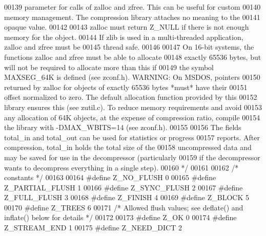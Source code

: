 \begin{DoxyCode}
00139 \textcolor{comment}{   parameter for calls of zalloc and zfree.  This can be useful for custom}
00140 \textcolor{comment}{   memory management.  The compression library attaches no meaning to the}
00141 \textcolor{comment}{   opaque value.}
00142 \textcolor{comment}{}
00143 \textcolor{comment}{     zalloc must return Z\_NULL if there is not enough memory for the object.}
00144 \textcolor{comment}{   If zlib is used in a multi-threaded application, zalloc and zfree must be}
00145 \textcolor{comment}{   thread safe.}
00146 \textcolor{comment}{}
00147 \textcolor{comment}{     On 16-bit systems, the functions zalloc and zfree must be able to allocate}
00148 \textcolor{comment}{   exactly 65536 bytes, but will not be required to allocate more than this if}
00149 \textcolor{comment}{   the symbol MAXSEG\_64K is defined (see zconf.h).  WARNING: On MSDOS, pointers}
00150 \textcolor{comment}{   returned by zalloc for objects of exactly 65536 bytes *must* have their}
00151 \textcolor{comment}{   offset normalized to zero.  The default allocation function provided by this}
00152 \textcolor{comment}{   library ensures this (see zutil.c).  To reduce memory requirements and avoid}
00153 \textcolor{comment}{   any allocation of 64K objects, at the expense of compression ratio, compile}
00154 \textcolor{comment}{   the library with -DMAX\_WBITS=14 (see zconf.h).}
00155 \textcolor{comment}{}
00156 \textcolor{comment}{     The fields total\_in and total\_out can be used for statistics or progress}
00157 \textcolor{comment}{   reports.  After compression, total\_in holds the total size of the}
00158 \textcolor{comment}{   uncompressed data and may be saved for use in the decompressor (particularly}
00159 \textcolor{comment}{   if the decompressor wants to decompress everything in a single step).}
00160 \textcolor{comment}{*/}
00161 
00162                         \textcolor{comment}{/* constants */}
00163 
00164 \textcolor{preprocessor}{#define Z\_NO\_FLUSH      0}
00165 \textcolor{preprocessor}{#define Z\_PARTIAL\_FLUSH 1}
00166 \textcolor{preprocessor}{#define Z\_SYNC\_FLUSH    2}
00167 \textcolor{preprocessor}{#define Z\_FULL\_FLUSH    3}
00168 \textcolor{preprocessor}{#define Z\_FINISH        4}
00169 \textcolor{preprocessor}{#define Z\_BLOCK         5}
00170 \textcolor{preprocessor}{#define Z\_TREES         6}
00171 \textcolor{comment}{/* Allowed flush values; see deflate() and inflate() below for details */}
00172 
00173 \textcolor{preprocessor}{#define Z\_OK            0}
00174 \textcolor{preprocessor}{#define Z\_STREAM\_END    1}
00175 \textcolor{preprocessor}{#define Z\_NEED\_DICT     2}

\end{DoxyCode}
